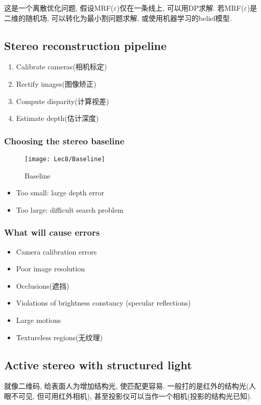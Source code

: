 这是一个离散优化问题, 假设MRF($\varepsilon$)仅在一条线上, 可以用DP求解. 若MRF($\varepsilon$)是二维的随机场, 可以转化为最小割问题求解, 或使用机器学习的belief模型. 

\subsection{Stereo reconstruction pipeline}

\begin{enumerate}
    \item Calibrate cameras(相机标定)
    \item Rectify images(图像矫正)
    \item Compute disparity(计算视差)
    \item Estimate depth(估计深度)
\end{enumerate}

\subsubsection{Choosing the stereo baseline}
\begin{figure}[H]
    \centering
    \texttt{[image: Lec8/Baseline]}
    \caption{Baseline}
\end{figure}
\begin{itemize}
    \item Too small: large depth error
    \item Too large: difficult search problem
\end{itemize}

\subsubsection{What will cause errors}
\begin{itemize}
    \item Camera calibration errors
    \item Poor image resolution
    \item Occlusions(遮挡)
    \item Violations of brightness constancy (specular reflections)
    \item Large motions
    \item Textureless regions(无纹理)
\end{itemize}

\subsection{Active stereo with structured light}
就像二维码, 给表面人为增加结构光, 使匹配更容易. 一般打的是红外的结构光(人眼不可见, 但可用红外相机), 甚至投影仪可以当作一个相机(投影的结构光已知). 

